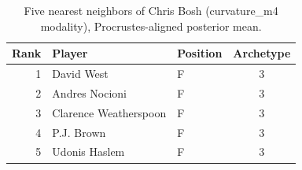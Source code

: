 \begin{table}[htbp]
  \centering\small
  \begin{tabular}{rllc}
    \toprule
    Rank & Player & Position & Archetype \\
    \midrule
    1 & David West & F & 3 \\
    2 & Andres Nocioni & F & 3 \\
    3 & Clarence Weatherspoon & F & 3 \\
    4 & P.J. Brown & F & 3 \\
    5 & Udonis Haslem & F & 3 \\
    \bottomrule
  \end{tabular}
  \caption{Five nearest neighbors of Chris Bosh (curvature_m4 modality), Procrustes-aligned posterior mean.}
  \label{tab:Chris_Bosh_neighbors_curvature_m4}
\end{table}


